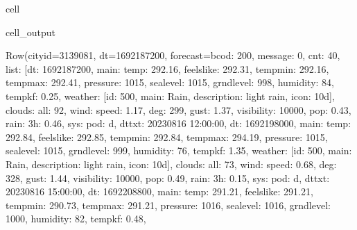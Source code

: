 \documentclass[letterpaper,10pt,english]{jupyterBook}
\begin{document}
\begin{sphinxuseclass}{cell}
\begin{sphinxVerbatimOutput}
\begin{sphinxuseclass}{cell_output}
\begin{sphinxVerbatim}[commandchars=\\\{\}]
Row(city\PYGZus{}id=3139081, dt=1692187200, forecast=b\PYGZdq{}\PYGZob{}\PYGZsq{}cod\PYGZsq{}: \PYGZsq{}200\PYGZsq{}, \PYGZsq{}message\PYGZsq{}: 0, \PYGZsq{}cnt\PYGZsq{}: 40, \PYGZsq{}list\PYGZsq{}: [\PYGZob{}\PYGZsq{}dt\PYGZsq{}: 1692187200, \PYGZsq{}main\PYGZsq{}: \PYGZob{}\PYGZsq{}temp\PYGZsq{}: 292.16, \PYGZsq{}feels\PYGZus{}like\PYGZsq{}: 292.31, \PYGZsq{}temp\PYGZus{}min\PYGZsq{}: 292.16, \PYGZsq{}temp\PYGZus{}max\PYGZsq{}: 292.41, \PYGZsq{}pressure\PYGZsq{}: 1015, \PYGZsq{}sea\PYGZus{}level\PYGZsq{}: 1015, \PYGZsq{}grnd\PYGZus{}level\PYGZsq{}: 998, \PYGZsq{}humidity\PYGZsq{}: 84, \PYGZsq{}temp\PYGZus{}kf\PYGZsq{}: \PYGZhy{}0.25\PYGZcb{}, \PYGZsq{}weather\PYGZsq{}: [\PYGZob{}\PYGZsq{}id\PYGZsq{}: 500, \PYGZsq{}main\PYGZsq{}: \PYGZsq{}Rain\PYGZsq{}, \PYGZsq{}description\PYGZsq{}: \PYGZsq{}light rain\PYGZsq{}, \PYGZsq{}icon\PYGZsq{}: \PYGZsq{}10d\PYGZsq{}\PYGZcb{}], \PYGZsq{}clouds\PYGZsq{}: \PYGZob{}\PYGZsq{}all\PYGZsq{}: 92\PYGZcb{}, \PYGZsq{}wind\PYGZsq{}: \PYGZob{}\PYGZsq{}speed\PYGZsq{}: 1.17, \PYGZsq{}deg\PYGZsq{}: 299, \PYGZsq{}gust\PYGZsq{}: 1.37\PYGZcb{}, \PYGZsq{}visibility\PYGZsq{}: 10000, \PYGZsq{}pop\PYGZsq{}: 0.43, \PYGZsq{}rain\PYGZsq{}: \PYGZob{}\PYGZsq{}3h\PYGZsq{}: 0.46\PYGZcb{}, \PYGZsq{}sys\PYGZsq{}: \PYGZob{}\PYGZsq{}pod\PYGZsq{}: \PYGZsq{}d\PYGZsq{}\PYGZcb{}, \PYGZsq{}dt\PYGZus{}txt\PYGZsq{}: \PYGZsq{}2023\PYGZhy{}08\PYGZhy{}16 12:00:00\PYGZsq{}\PYGZcb{}, \PYGZob{}\PYGZsq{}dt\PYGZsq{}: 1692198000, \PYGZsq{}main\PYGZsq{}: \PYGZob{}\PYGZsq{}temp\PYGZsq{}: 292.84, \PYGZsq{}feels\PYGZus{}like\PYGZsq{}: 292.85, \PYGZsq{}temp\PYGZus{}min\PYGZsq{}: 292.84, \PYGZsq{}temp\PYGZus{}max\PYGZsq{}: 294.19, \PYGZsq{}pressure\PYGZsq{}: 1015, \PYGZsq{}sea\PYGZus{}level\PYGZsq{}: 1015, \PYGZsq{}grnd\PYGZus{}level\PYGZsq{}: 999, \PYGZsq{}humidity\PYGZsq{}: 76, \PYGZsq{}temp\PYGZus{}kf\PYGZsq{}: \PYGZhy{}1.35\PYGZcb{}, \PYGZsq{}weather\PYGZsq{}: [\PYGZob{}\PYGZsq{}id\PYGZsq{}: 500, \PYGZsq{}main\PYGZsq{}: \PYGZsq{}Rain\PYGZsq{}, \PYGZsq{}description\PYGZsq{}: \PYGZsq{}light rain\PYGZsq{}, \PYGZsq{}icon\PYGZsq{}: \PYGZsq{}10d\PYGZsq{}\PYGZcb{}], \PYGZsq{}clouds\PYGZsq{}: \PYGZob{}\PYGZsq{}all\PYGZsq{}: 73\PYGZcb{}, \PYGZsq{}wind\PYGZsq{}: \PYGZob{}\PYGZsq{}speed\PYGZsq{}: 0.68, \PYGZsq{}deg\PYGZsq{}: 328, \PYGZsq{}gust\PYGZsq{}: 1.44\PYGZcb{}, \PYGZsq{}visibility\PYGZsq{}: 10000, \PYGZsq{}pop\PYGZsq{}: 0.49, \PYGZsq{}rain\PYGZsq{}: \PYGZob{}\PYGZsq{}3h\PYGZsq{}: 0.15\PYGZcb{}, \PYGZsq{}sys\PYGZsq{}: \PYGZob{}\PYGZsq{}pod\PYGZsq{}: \PYGZsq{}d\PYGZsq{}\PYGZcb{}, \PYGZsq{}dt\PYGZus{}txt\PYGZsq{}: \PYGZsq{}2023\PYGZhy{}08\PYGZhy{}16 15:00:00\PYGZsq{}\PYGZcb{}, \PYGZob{}\PYGZsq{}dt\PYGZsq{}: 1692208800, \PYGZsq{}main\PYGZsq{}: \PYGZob{}\PYGZsq{}temp\PYGZsq{}: 291.21, \PYGZsq{}feels\PYGZus{}like\PYGZsq{}: 291.21, \PYGZsq{}temp\PYGZus{}min\PYGZsq{}: 290.73, \PYGZsq{}temp\PYGZus{}max\PYGZsq{}: 291.21, \PYGZsq{}pressure\PYGZsq{}: 1016, \PYGZsq{}sea\PYGZus{}level\PYGZsq{}: 1016, \PYGZsq{}grnd\PYGZus{}level\PYGZsq{}: 1000, \PYGZsq{}humidity\PYGZsq{}: 82, \PYGZsq{}temp\PYGZus{}kf\PYGZsq{}: 0.48\PYGZcb{}, 
\end{sphinxVerbatim}
\end{sphinxuseclass}
\end{sphinxVerbatimOutput}
\end{sphinxuseclass}
\end{document}

